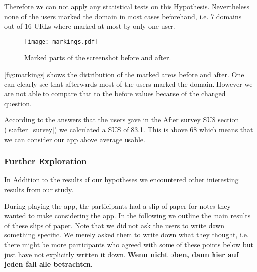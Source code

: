 \begin{description}[leftmargin=0cm]
Therefore we can not apply any statistical tests on this Hypothesis.
Nevertheless none of the users marked the domain in most cases beforehand, i.e. 7 domains out of 16 URLs where marked at most by only one user.
\begin{figure}
\centering
\texttt{[image: markings.pdf]}
\caption{Marked parts of the screenshot before and after.}
\label{fig:markings}
\end{figure}
\autoref{fig:markings} shows the distribution of the marked areas before and after. One can clearly see that afterwards most of the users marked the domain. However we are not able to compare that to the before values because of the changed question.
\item[Hypothesis 4]
According to the answers that the users gave in the After survey SUS section (\autoref{s:after_survey}) we calculated a SUS of 83.1. This is above 68 which means that we can consider our app above average usable.
\end{description}

\subsubsection{Further Exploration}
\label{s:further_exploration}
In Addition to the results of our hypotheses we encountered other interesting results from our study.

\begin{description}[leftmargin=0cm]
	\item[text]
\end{description}


During playing the app, the participants had a slip of paper for notes they wanted to make considering the app.
In the following we outline the main results of these slips of paper.
Note that we did not ask the users to write down something specific. 
We merely asked them to write down what they thought, i.e. there might be more participants who agreed with some of these points below but just have not explicitly written it down.
\textbf{Wenn nicht oben, dann hier auf jeden fall alle betrachten}.

